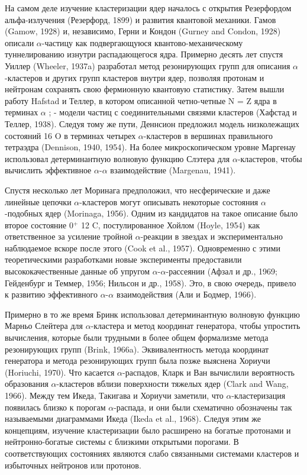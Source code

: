 \documentclass[fontsize=14pt]{scrarticle}
\begin{document}
На самом деле изучение кластеризации ядер началось с открытия Резерфордом альфа-излучения (Резерфорд, 1899) и развития квантовой механики. Гамов (Gamow, 1928) и, независимо, Герни и Кондон (Gurney and Condon, 1928) описали $\alpha$-частицу как подвергающуюся квантово-механическому туннелированию изнутри распадающегося ядра. Примерно десять лет спустя Уиллер (Wheeler, 1937a) разработал метод резонирующих групп для описания $\alpha$-кластеров и других групп кластеров внутри ядер, позволяя протонам и нейтронам сохранять свою фермионную квантовую статистику. Затем вышли работу Hafstad и Теллер, в котором описанной четно-четные N = Z ядра в терминах  $\alpha$ ; - модели частиц с соединительными связями кластеров (Хафстад и Теллер, 1938). Следуя тому же пути, Деннсион предложил модель низколежащих состояний 16 O в терминах четырех $\alpha$-кластеров в вершинах правильного тетраэдра (Dennison, 1940, 1954). На более микроскопическом уровне Маргенау использовал детерминантную волновую функцию Слэтера для $\alpha$-кластеров, чтобы вычислить эффективное $\alpha$-$\alpha$ взаимодействие (Margenau, 1941). 

Спустя несколько лет Моринага предположил, что несферические и даже линейные цепочки $\alpha$-кластеров могут описывать некоторые состояния $\alpha$-подобных ядер (Morinaga, 1956). Одним из кандидатов на такое описание было второе состояние 0$^{+}$ 12 C, постулированное Хойлом (Hoyle, 1954) как ответственное за усиление тройной $\alpha$-реакции в звездах и экспериментально наблюдаемое вскоре после этого (Cook et al., 1957). Одновременно с этими теоретическими разработками новые эксперименты предоставили высококачественные данные об упругом $\alpha$-$\alpha$-рассеянии (Афзал и др., 1969; Гейденбург и Теммер, 1956; Нильсон и др., 1958). Это, в свою очередь, привело к развитию эффективного $\alpha$-$\alpha$ взаимодействия (Али и Бодмер, 1966). 

Примерно в то же время Бринк использовал детерминантную волновую функцию Марньо Слейтера для $\alpha$-кластера и метод координат генератора, чтобы упростить вычисления, которые были трудными в более общем формализме метода резонирующих групп (Brink, 1966a). Эквивалентность метода координат генератора и метода резонирующих групп была позже выяснена Хориучи (Horiuchi, 1970). Что касается $\alpha$-распадов, Кларк и Ван вычислили вероятность образования $\alpha$-кластеров вблизи поверхности тяжелых ядер (Clark and Wang, 1966). Между тем Икеда, Такигава и Хориучи заметили, что $\alpha$-кластеризация появилась близко к порогам $\alpha$-распада, и они были схематично обозначены так называемыми диаграммами Икеда (Ikeda et al., 1968). Следуя этим же концепциям, изучение кластеризации было расширено на богатые протонами и нейтронно-богатые системы с близкими открытыми порогами. В соответствующих состояниях являются слабо связанными системами кластеров и избыточных нейтронов или протонов. 
\end{document}
